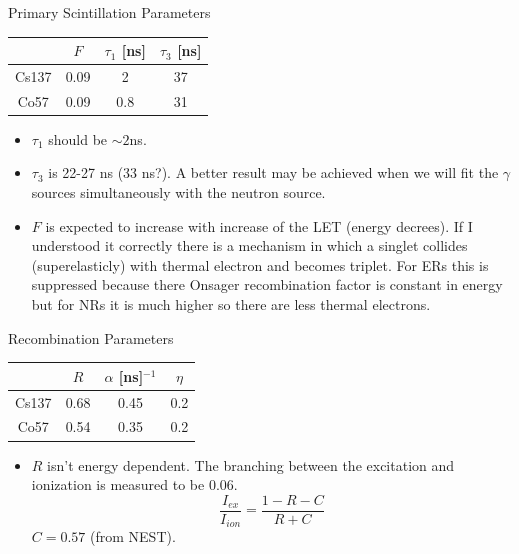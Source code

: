 \documentclass{beamer}
\begin{document}
\begin{frame}{Primary Scintillation Parameters}
\begin{center}
\begin{tabular}{|c|c|c|c|}
\hline
&$F$ & $\tau_1$ [ns]& $\tau_3$ [ns]\\
\hline
Cs137 & 0.09 & 2 & 37 \\
\hline
Co57 & 0.09 & 0.8 & 31 \\
\hline
\end{tabular}
\end{center}
\begin{itemize}
\item $\tau_1$ should be $\sim2$ns.
\item $\tau_3$ is 22-27 ns (33 ns?). A better result may be achieved when we will fit the $\gamma$ sources simultaneously with the neutron source. 
\item $F$ is expected to increase with increase of the LET (energy decrees). If I understood it correctly there is a mechanism in which a singlet collides (superelasticly) with thermal electron and becomes triplet. For ERs this is suppressed because there Onsager recombination factor is constant in energy but for NRs it is much higher so there are less thermal electrons.
\end{itemize}
\end{frame}

\begin{frame}{Recombination Parameters}
\begin{center}
\begin{tabular}{|c|c|c|c|}
\hline
&$R$ & $\alpha$ [ns]$^{-1}$& $\eta$\\
\hline
Cs137 & 0.68 & 0.45 & 0.2 \\
\hline
Co57 & 0.54 & 0.35 & 0.2 \\
\hline
\end{tabular}
\end{center}
\begin{itemize}
\item $R$ isn't energy dependent. The branching between the excitation and ionization is measured to be 0.06.
\begin{equation}
\frac{I_{ex}}{I_{ion}}=\frac{1-R-C}{R+C}
\end{equation}
$C=0.57$ (from NEST).
\end{itemize}
\end{frame}
\end{document}
